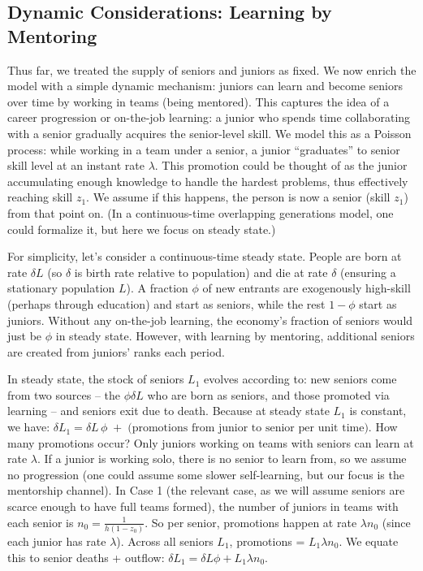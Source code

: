 \documentclass[12pt]{article}
\begin{document}
\subsection{Dynamic Considerations: Learning by
Mentoring}\label{dynamic-considerations-learning-by-mentoring}

Thus far, we treated the supply of seniors and juniors as fixed. We now
enrich the model with a {simple dynamic mechanism: juniors can
learn and become seniors over time by working in teams (being
mentored)}. This captures the idea of a {career progression or
on-the-job learning}: a junior who spends time collaborating with a
senior gradually acquires the senior-level skill. We model this as a
{Poisson process}: while working in a team under a senior, a
junior ``graduates'' to senior skill level at an instant rate
\(\lambda\). This promotion could be thought of as the junior
accumulating enough knowledge to handle the hardest problems, thus
effectively reaching skill \(z_1\). We assume if this happens, the
person is now a senior (skill \(z_1\)) from that point on. (In a
continuous-time overlapping generations model, one could formalize it,
but here we focus on steady state.)

For simplicity, let's consider a continuous-time steady state. People
are born at rate \(\delta L\) (so \(\delta\) is birth rate relative to
population) and die at rate \(\delta\) (ensuring a stationary population
\(L\)). A fraction \(\phi\) of new entrants are {exogenously}
high-skill (perhaps through education) and start as seniors, while the
rest \(1-\phi\) start as juniors. Without any on-the-job learning, the
economy's fraction of seniors would just be \(\phi\) in steady state.
However, {with learning by mentoring, additional seniors are
created from juniors' ranks} each period.

In steady state, the {stock of seniors \(L_1\)} evolves according
to: new seniors come from two sources -- the \(\phi \delta L\) who are
born as seniors, and those promoted via learning -- and seniors exit due
to death. Because at steady state \(L_1\) is constant, we have:
\(\delta L_1 = \delta L\,\phi \;+\; \text{(promotions from junior to senior per unit time)}.\)
How many promotions occur? Only juniors {working on teams} with
seniors can learn at rate \(\lambda\). If a junior is working solo,
there is no senior to learn from, so we assume no progression (one could
assume some slower self-learning, but our focus is the mentorship
channel). In Case 1 (the relevant case, as we will assume seniors are
scarce enough to have full teams formed), the number of juniors in teams
with each senior is \(n_0 = \frac{1}{h(1-z_0)}\). So per senior,
promotions happen at rate \(\lambda n_0\) (since each junior has rate
\(\lambda\)). Across all seniors \(L_1\), promotions =
\(L_1 \lambda n_0\). We equate this to senior deaths + outflow:
\(\delta L_1 = \delta L \phi + L_1 \lambda n_0.\)
\end{document}
